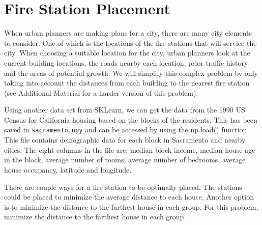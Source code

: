 \section*{Fire Station Placement} %
When urban planners are making plans for a city, there are many city elements to consider. 
One of which is the locations of the fire stations that will service the city.
When choosing a suitable location for the city, urban planners look at the current building locations, the roads nearby each location, prior traffic history and the areas of potential growth.
We will simplify this complex problem by only taking into account the distances from each building to the nearest fire station (see Additional Material for a harder version of this problem).

Using another data set from SKLearn, we can get the data from the 1990 US Census for California housing based on the blocks of the residents.
This has been saved in \texttt{sacramento.npy} and can be accessed by using the np.load() function.
This file contains demographic data for each block in Sacramento and nearby cities. 
The eight columns in the file are: median block income, median house age in the block, average number of rooms, average number of bedrooms, average house occupancy, latitude and longitude.

There are couple ways for a fire station to be optimally placed. 
The stations could be placed to minimize the average distance to each house.
Another option is to minimize the distance to the farthest house in each group.
For this problem, minimize the distance to the farthest house in each group.

